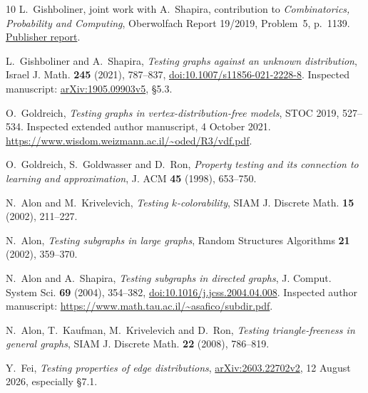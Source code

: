 \documentclass[11pt]{article}
\begin{document}
\begin{thebibliography}{10}\small
{}
L.~Gishboliner, joint work with A.~Shapira,
contribution to \emph{Combinatorics, Probability and Computing},
Oberwolfach Report 19/2019, Problem~5, p.~1139. 
\href{https://ems.press/content/serial-article-files/46798}{Publisher report}.

L.~Gishboliner and A.~Shapira,
\emph{Testing graphs against an unknown distribution},
Israel J. Math. \textbf{245} (2021), 787--837,
\href{https://doi.org/10.1007/s11856-021-2228-8}{doi:10.1007/s11856-021-2228-8}.
Inspected manuscript:
\href{https://arxiv.org/abs/1905.09903v5}{arXiv:1905.09903v5}, \S5.3.

O.~Goldreich, \emph{Testing graphs in vertex-distribution-free models},
STOC 2019, 527--534. Inspected extended author manuscript,
4 October 2021.
\url{https://www.wisdom.weizmann.ac.il/~oded/R3/vdf.pdf}.

O.~Goldreich, S.~Goldwasser and D.~Ron,
\emph{Property testing and its connection to learning and approximation},
J. ACM \textbf{45} (1998), 653--750.

N.~Alon and M.~Krivelevich, \emph{Testing $k$-colorability},
SIAM J. Discrete Math. \textbf{15} (2002), 211--227.

N.~Alon, \emph{Testing subgraphs in large graphs},
Random Structures Algorithms \textbf{21} (2002), 359--370.

N.~Alon and A.~Shapira, \emph{Testing subgraphs in directed graphs},
J. Comput. System Sci. \textbf{69} (2004), 354--382,
\href{https://doi.org/10.1016/j.jcss.2004.04.008}{doi:10.1016/j.jcss.2004.04.008}.
Inspected author manuscript:
\url{https://www.math.tau.ac.il/~asafico/subdir.pdf}.

N.~Alon, T.~Kaufman, M.~Krivelevich and D.~Ron,
\emph{Testing triangle-freeness in general graphs},
SIAM J. Discrete Math. \textbf{22} (2008), 786--819.

Y.~Fei, \emph{Testing properties of edge distributions},
\href{https://arxiv.org/abs/2603.22702v2}{arXiv:2603.22702v2},
12 August 2026, especially \S7.1.
\end{thebibliography}
\end{document}
